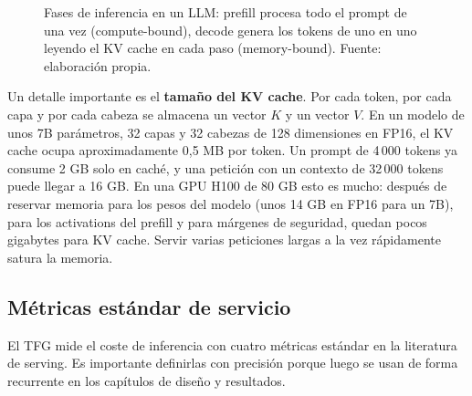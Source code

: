\documentclass[11pt,a4paper]{article}
\begin{document}
\begin{figure}[H]
\centering
{}%
\caption{Fases de inferencia en un LLM: prefill procesa todo el prompt de una vez (compute-bound), decode genera los tokens de uno en uno leyendo el KV cache en cada paso (memory-bound). Fuente: elaboración propia.}
\label{fig:prefill-decode}
\end{figure}

Un detalle importante es el \textbf{tamaño del KV cache}. Por cada token, por cada capa y por cada cabeza se almacena un vector $K$ y un vector $V$. En un modelo de unos 7B parámetros, 32 capas y 32 cabezas de 128 dimensiones en FP16, el KV cache ocupa aproximadamente 0,5 MB por token. Un prompt de 4\,000 tokens ya consume 2 GB solo en caché, y una petición con un contexto de 32\,000 tokens puede llegar a 16 GB. En una GPU H100 de 80 GB esto es mucho: después de reservar memoria para los pesos del modelo (unos 14 GB en FP16 para un 7B), para los activations del prefill y para márgenes de seguridad, quedan pocos gigabytes para KV cache. Servir varias peticiones largas a la vez rápidamente satura la memoria.

\subsection{Métricas estándar de servicio}

El TFG mide el coste de inferencia con cuatro métricas estándar en la literatura de serving. Es importante definirlas con precisión porque luego se usan de forma recurrente en los capítulos de diseño y resultados.
\end{document}
